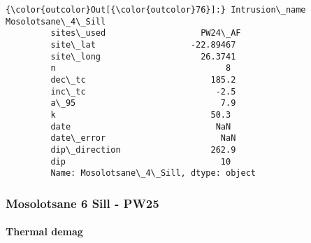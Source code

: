 \documentclass{article}
\begin{document}
            \begin{Verbatim}[commandchars=\\\{\}]
{\color{outcolor}Out[{\color{outcolor}76}]:} Intrusion\_name    Mosolotsane\_4\_Sill
         sites\_used                   PW24\_AF
         site\_lat                   -22.89467
         site\_long                    26.3741
         n                                  8
         dec\_tc                         185.2
         inc\_tc                          -2.5
         a\_95                             7.9
         k                               50.3
         date                             NaN
         date\_error                       NaN
         dip\_direction                  262.9
         dip                               10
         Name: Mosolotsane\_4\_Sill, dtype: object
\end{Verbatim}
        
    \subsubsection{Mosolotsane 6 Sill -
PW25}\label{mosolotsane-6-sill---pw25}

    \paragraph{Thermal demag}\label{thermal-demag}
\end{document}
